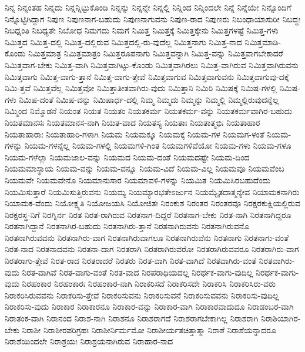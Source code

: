 {ನಿನ್ನ
ನಿನ್ನಂತಹ
ನಿನ್ನದು
ನಿನ್ನನ್ನಿಟ್ಟುಕೊಂಡಿ
ನಿನ್ನನ್ನು
ನಿನ್ನನ್ನೇ
ನಿನ್ನಲ್ಲಿ
ನಿನ್ನಿಂದ
ನಿನ್ನಿಂದಲೇ
ನಿನ್ನೆ
ನಿನ್ನೆಯೇ
ನಿನ್ನೊಂದಿಗೆ
ನಿನ್ನೊಟ್ಟಿಗಿದ್ದಾಗ
ನಿಪುಣ
ನಿಪುಣನಾಗ-ಬಹುದು
ನಿಪುಣನಾಗುವನು
ನಿಪುಣ-ರಾದ
ನಿಪುಣರು
ನಿಬಂಧಾಯಾಸುರೀ
ನಿಬದ್ಧಃ
ನಿಬಧ್ನಂತಿ
ನಿಬಧ್ಯತೇ
ನಿಬೋಧ
ನಿಮಗದು
ನಿಮಗೆ
ನಿಮಿತ್ತ
ನಿಮಿತ್ತಕ್ಕೆ
ನಿಮಿತ್ತಕ್ಕೇನು
ನಿಮಿತ್ತಗಳಷ್ಟೆ
ನಿಮಿತ್ತ-ಗಳು
ನಿಮಿತ್ತದ
ನಿಮಿತ್ತ-ದಲ್ಲಿ
ನಿಮಿತ್ತ-ದಲ್ಲಿರುವ
ನಿಮಿತ್ತದಲ್ಲಿ-ರು-ವುದೆಲ್ಲ
ನಿಮಿತ್ತನಾಗು
ನಿಮಿತ್ತ-ನಾದ
ನಿಮಿತ್ತಮಾಡಿ-ಕೊಂಡು
ನಿಮಿತ್ತಮಾತ್ರ
ನಿಮಿತ್ತಮಾತ್ರಂ
ನಿಮಿತ್ತರೂಪನಾಗು
ನಿಮಿತ್ತವನ್ನಾಗಿ
ನಿಮಿತ್ತ-ವನ್ನು
ನಿಮಿತ್ತವಾಗಬೇಕಾದರೆ
ನಿಮಿತ್ತವಾಗ-ಬೇಕು
ನಿಮಿತ್ತ-ವಾಗಿ
ನಿಮಿತ್ತವಾಗಿಟ್ಟು-ಕೊಂಡು
ನಿಮಿತ್ತವಾಗಿರಲು
ನಿಮಿತ್ತ-ವಾಗಿರುವ
ನಿಮಿತ್ತವಾಗಿರುವನು
ನಿಮಿತ್ತವಾಗು
ನಿಮಿತ್ತ-ವಾಗು-ತ್ತಾನೆ
ನಿಮಿತ್ತ-ವಾಗು-ತ್ತೇವೆ
ನಿಮಿತ್ತವಾಗುವ
ನಿಮಿತ್ತವಾಗುವನು
ನಿಮಿತ್ತವಾಗುವು-ದಕ್ಕೆ
ನಿಮಿ-ತ್ತವೆ
ನಿಮಿತ್ತವೆಲ್ಲ
ನಿಮಿತ್ತವೋ
ನಿಮಿತ್ತಾತೀತವಾಗಿರು-ವುದು
ನಿಮಿತ್ತಾನಿ
ನಿಮಿರಿ
ನಿಮಿಷಕ್ಕೆ
ನಿಮಿಷ-ಗಳಲ್ಲಿ
ನಿಮಿಷ-ಗಳು
ನಿಮಿಷ-ದಂತೆ
ನಿಮಿಷ-ವನ್ನು
ನಿಮಿಷಾರ್ಧ-ದಲ್ಲಿ
ನಿಮ್ಮ
ನಿಮ್ಮದು
ನಿಮ್ಮನ್ನು
ನಿಮ್ಮಲ್ಲಿ
ನಿಮ್ಮಲ್ಲಿರುವುದನ್ನೆಲ್ಲ
ನಿಮ್ಮಿಂದ
ನಿಮ್ಮೊಡನೆ
ನಿಯಂತ
ನಿಯತ
ನಿಯತಂ
ನಿಯತಕರ್ಮ
ನಿಯತಕರ್ಮ-ವನ್ನು
ನಿಯತಕರ್ಮವಾಗಿರ-ಬಹುದು
ನಿಯತಮಾನಸಃ
ನಿಯತಮಾನಸ-ನಾಗಿ
ನಿಯತ-ವಾದ
ನಿಯತಸ್ಯ
ನಿಯತಾಃ
ನಿಯತಾತ್ಮಭಿಃ
ನಿಯತಾಹಾರ
ನಿಯತಾಹಾರಾಃ
ನಿಯತಾಹಾರಿ-ಗಳಾಗಿ
ನಿಯಮ
ನಿಯಮಕ್ಕೂ
ನಿಯಮಕ್ಕೆ
ನಿಯಮ-ಗಳ
ನಿಯಮಗ-ಳಂತೆ
ನಿಯಮ-ಗಳನ್ನು
ನಿಯಮ-ಗಳನ್ನೆಲ್ಲ
ನಿಯಮ-ಗಳಲ್ಲಿ
ನಿಯಮಗಳಿ-ಗಿಂತ
ನಿಯಮಗಳಿವೆಯೋ
ನಿಯಮ-ಗಳು
ನಿಯಮ-ಗಳೂ
ನಿಯಮ-ಗಳೆಲ್ಲಾ
ನಿಯಮಜಾಲ-ವನ್ನು
ನಿಯಮದ
ನಿಯಮ-ದಂತೆ
ನಿಯಮದಷ್ಟೇ
ನಿಯಮ-ದಿಂದ
ನಿಯಮಮಾಸ್ಥಾಯ
ನಿಯಮ-ವನ್ನು
ನಿಯಮ-ವನ್ನೂ
ನಿಯಮ-ವಿದೆ
ನಿಯಮ-ವಿಲ್ಲ
ನಿಯಮವೂ
ನಿಯಮವೆಂಬ
ನಿಯಮವೇ
ನಿಯಮವೇನೊ
ನಿಯಮಾನುಸಾರ
ನಿಯಮಾವಳಿ-ಗಳನ್ನು
ನಿಯಮಿತ
ನಿಯಮಿಸಿರಬಹುದೆಂದು
ನಿಯಮಿಸುತ್ತಾರೆ
ನಿಯಮಿಸುತ್ತಿರುವನು
ನಿಯಮ್ಯ
ನಿಯಮ್ಯಾರಭತೇಽರ್ಜುನ
ನಿಯಮ್ಯೈತದಾತ್ಮನ್ಯೇವ
ನಿಯಾಮಕನಾಗಿರು
ನಿಯಾಮಕ-ವೆಂದು
ನಿಯೋಕ್ಷ್ಯತಿ
ನಿಯೋಜಯಸಿ
ನಿಯೋಜಿತಃ
ನಿರಂಕುಶ
ನಿರಂತರ
ನಿರಂತರವೂ
ನಿರಕ್ಷರಕುಕ್ಷಿಯಲ್ಲಿರುವ
ನಿರಕ್ಷರಸ್ಥ-ನಿಗೆ
ನಿರಗ್ನಿರ್ನ
ನಿರತ
ನಿರತ-ರಾಗಿರುವ
ನಿರತನಾಗ-ದಿದ್ದರೆ
ನಿರತನಾಗ-ಬೇಕು
ನಿರತ-ನಾಗಿ
ನಿರತನಾಗಿದ್ದರೂ
ನಿರತನಾಗಿದ್ದಾನೆ
ನಿರತನಾಗಿರ-ಬಹುದು
ನಿರತನಾಗಿರು-ತ್ತಾನೆ
ನಿರತನಾಗಿರುವನು
ನಿರತನಾಗಿರುವನೊ
ನಿರತನಾಗಿರುವವನು
ನಿರತನಾಗಿರು-ವಾಗ
ನಿರತನಾಗಿರುವಾಗಲೂ
ನಿರತನಾಗಿರುವೆನು
ನಿರತನಾಗು
ನಿರತನಾಗು-ವಂತೆ
ನಿರತ-ನಾದ
ನಿರತನಾದವನು
ನಿರತನಾ-ದಾಗ
ನಿರತರಾಗಿ
ನಿರತರಾಗಿರುವರೋ
ನಿರತರಾಗಿರುವವರೂ
ನಿರತರಾಗಿರು-ವಾಗ
ನಿರತರಾಗು-ತ್ತೇವೆ
ನಿರತ-ರಾದ
ನಿರತರಾದರೆ
ನಿರತರು
ನಿರತ-ವಾಗಿ
ನಿರತ-ವಾಗಿದೆ
ನಿರತವಾಗಿರು-ವಂತೆ
ನಿರತವಾಗಿರು-ವುದು
ನಿರತ-ವಾಗಿವೆ
ನಿರತ-ವಾಗು-ವಂತೆ
ನಿರತ-ವಾದ
ನಿರಪರಾಧಿಯದಲ್ಲ
ನಿರರ್ಥಕ-ವಾಗು-ವುದಿಲ್ಲ
ನಿರರ್ಥಕ-ವಾಗು-ವುದು
ನಿರಹಂಕಾರ
ನಿರಹಂಕಾರಃ
ನಿರಹಂಕಾರ-ನಾಗಿ
ನಿರಾಕರಿಸದೆ
ನಿರಾಕರಿಸದೇ
ನಿರಾಕರಿಸಿ
ನಿರಾಕರಿಸಿರು-ವರು
ನಿರಾಕರಿಸಿರುವವನು
ನಿರಾಕರಿಸು-ತ್ತೇವೆ
ನಿರಾಕರಿಸುವನು
ನಿರಾಕರಿಸುವನೆ
ನಿರಾಕರಿಸುವವನು
ನಿರಾಕರಿಸು-ವುದಿಲ್ಲ
ನಿರಾಕರಿಸು-ವುದು
ನಿರಾಕಾರ
ನಿರಾಕಾರನೂ
ನಿರಾಕಾರ-ವನ್ನು
ನಿರಾಕಾರ-ವಾಗಿ
ನಿರಾಕಾರವಾದುದೂ
ನಿರಾಡಂಬರ-ವಾಗಿ
ನಿರಾತಂಕ-ವಾಗಿ
ನಿರಾನಂದ
ನಿರಾಶ-ನಾಗಿ
ನಿರಾಶನೂ
ನಿರಾಶರಾಗದೆ
ನಿರಾಶರಾಗಬೇಕಾಗಿಲ್ಲ
ನಿರಾಶರಾಗಿ
ನಿರಾಶಿಯಾಗಿರ-ಬೇಕು
ನಿರಾಶೀ
ನಿರಾಶೀರಪರಿಗ್ರಹಃ
ನಿರಾಶೀರ್ನಿರ್ಮಮೋ
ನಿರಾಶೀರ್ಯತಚಿತ್ತಾತ್ಮಾ
ನಿರಾಶೆ
ನಿರಾಶೆಯನ್ನಾದರೂ
ನಿರಾಶೆಯಿಂದಲೇ
ನಿರಾಶ್ರಯಃ
ನಿರಾಶ್ರಯನಾಗಿರುವ
ನಿರಾಹಾರ-ನಾದ
}
